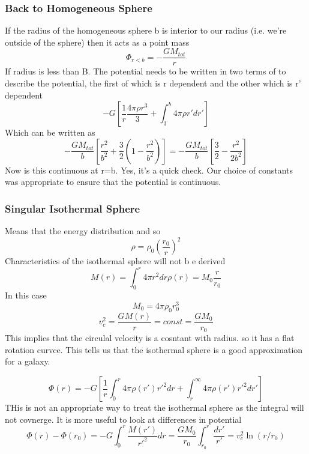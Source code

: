 \documentclass[12pt]{article} %
\begin{document}
\subsubsection{Back to Homogeneous Sphere}
If the radius of the homogeneous sphere b is interior to our radius
(i.e. we're outside of the sphere) then it acts as a point mass
\begin{equation}
\Phi_{r <b} = -\frac{GM_{tot}}{r}
\end{equation}
If radius is less than B. The potential needs to be written in two terms
of to describe the potential, the first of which is r dependent and
the other which is r' dependent
\begin{equation}
- G \left[ \frac{1}{r} \frac{4\pi\rho r^3}{3} + \int^b_3 4\pi\rho r'dr'\right]
\end{equation}
Which can be written as 
\begin{equation}
-\frac{GM_{tot}}{b} \left[ \frac{r^2}{b^2} + \frac{3}{2} ( 1 -
  \frac{r^2}{b^2})\right] = - \frac{GM_{tot}}{b} \left[ \frac{3}{2} -
  \frac{r^2}{2b^2}\right]
\end{equation}
Now is this continuous at r=b. Yes, it's a quick check. Our choice of
constants was appropriate to ensure that the potential is
continuous. 

\subsubsection{Singular Isothermal Sphere}
Means that the energy distribution and so
\begin{equation}
\rho = \rho_0 \left(\frac{r_0}{r}\right)^2
\end{equation}
Characteristics of the isothermal sphere will not b e derived
\begin{equation}
M(r) = \int_0^r 4\pi r^2 dr \rho(r) = M_0 \frac{r}{r_0}
\end{equation}
In this case
\begin{equation}
M_0 = 4\pi \rho_0 r_0^3
\end{equation}
\begin{equation}
v_c^2 = \frac{GM(r)}{r} = const = \frac{GM_0}{r_0}
\end{equation}
This implies that the circulal velocity is a cosntant with radius. so it has a flat rotation curvce. This tells us that the isothermal sphere is a good approximation for a galaxy.

\begin{equation}
\Phi(r) = -G[\frac{1}{r} \int_0^r 4\pi \rho(r') r'^2 dr + \int^\infty_r 4\pi \rho(r') r'^2 dr']
\end{equation}
THis is not an appropriate way to treat the isothermal sphere as the integral will not covnerge. It is more useful to look at differences in potential
\begin{equation}
\Phi(r) - \Phi(r_0) = -G\int_0^r \frac{M(r')}{r'^2} dr = \frac{GM_0}{r_0} \int_{r_0}^r \frac{dr'}{r'} = v_c^2 \ln(r/r_0)
\end{equation}
\end{document}
